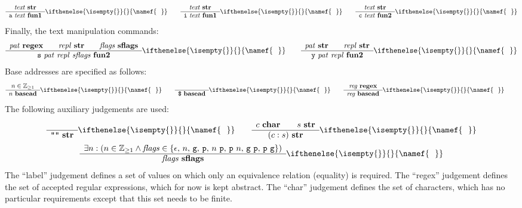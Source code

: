 \documentclass[11pt]{article}
\newcommand{\ifempty}[3]{\ifthenelse{\isempty{#1}}{#2}{#3}}
\newcommand\RULE[3][]{\begin{array}{c} #2 \\ \hline #3 \end{array}\ifempty{#1}{}{\namef{\text{\ \ #1}}}}
\newcommand\J[1]{\ensuremath{\textbf{#1}}}
\newcommand\cmd[1]{\ensuremath{\text{\texttt{#1}}}}
\newcommand\code[1]{\ensuremath{\text{\texttt{#1}}}}
\renewcommand\arg[1]{\ensuremath{\mathit{#1}}}
\begin{document}
\begin{gather*}
	\RULE{\arg{text}\ \J{str}}{\cmd{a}\ \arg{text}\ \J{fun1}} \qquad
	\RULE{\arg{text}\ \J{str}}{\cmd{i}\ \arg{text}\ \J{fun1}} \qquad
	\RULE{\arg{text}\ \J{str}}{\cmd{c}\ \arg{text}\ \J{fun2}}
\end{gather*}
Finally, the text manipulation commands:
\begin{gather*}
	\RULE{\arg{pat}\ \J{regex} \qquad \arg{repl}\ \J{str} \qquad \arg{flags}\ \J{sflags}}{\cmd{s}\ \arg{pat}\ \arg{repl}\ \arg{sflags}\ \J{fun2}} \qquad
	\RULE{\arg{pat}\ \J{str} \qquad \arg{repl}\ \J{str}}{\cmd{y}\ \arg{pat}\ \arg{repl}\ \J{fun2}}
\end{gather*}
Base addresses are specified as follows:
\begin{gather*}
	\RULE{n \in \mathbb{Z}_{\geq 1}}{n\ \J{basead}} \qquad
	\RULE{}{\cmd{\$}\ \J{basead}} \qquad
	\RULE{\arg{reg}\ \J{regex}}{\arg{reg}\ \J{basead}} \qquad
\end{gather*}
The following auxiliary judgements are used:
\begin{gather*}
	\RULE{}{\code{""}\ \J{str}} \qquad
	\RULE{c\ \J{char} \qquad s\ \J{str}}{(c : s)\ \J{str}} \\
	\RULE{\exists n : (n \in \mathbb{Z}_{\geq1} \land \arg{flags} \in \{\epsilon,\, n,\, \cmd{g},\, \cmd{p},\, n\ \cmd{p},\, \cmd{p}\ n,\, \cmd{g}\ \cmd{p},\, \cmd{p}\ \cmd{g}\})}{\arg{flags}\ \J{sflags}}
\end{gather*}
The ``label'' judgement defines a set of values on which only an equivalence relation (equality) is required.
The ``regex'' judgement defines the set of accepted regular expressions, which for now is kept abstract.
The ``char'' judgement defines the set of characters, which has no particular requirements except that this set needs to be finite.
\end{document}
